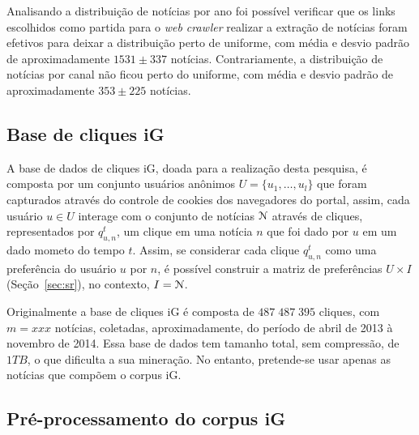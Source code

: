 \documentclass[normaltoc, espacoumemeio, pnumromarab,ruledheader]{abnt}
\begin{document}
Analisando a distribuição de notícias por ano foi possível verificar que os links escolhidos como partida para o \textit{web crawler} realizar a extração de notícias foram efetivos para deixar a distribuição perto de uniforme, com média e desvio padrão de aproximadamente $1531 \pm 337$ notícias.
Contrariamente, a distribuição de notícias por canal não ficou perto do uniforme, com média e desvio padrão de aproximadamente $353 \pm 225$ notícias.

\subsection{Base de cliques iG}
\label{subsec:basecliquesig}

A base de dados de cliques iG, doada para a realização desta pesquisa, é composta por um conjunto usuários anônimos $U = \{ u_1, \dots, u_l \}$ que foram capturados através do controle de cookies dos navegadores do portal, assim, cada usuário $u \in U$ interage com o conjunto de notícias ${\cal N}$ através de cliques, representados por $q_{u,n}^t$, um clique em uma notícia $n$ que foi dado por $u$ em um dado mometo do tempo $t$.
Assim, se considerar cada clique $q_{u,n}^t$ como uma preferência do usuário $u$ por $n$, é possível construir a matriz de preferências $U \times I$ (Seção~\ref{sec:sr}), no contexto, $I = {\cal N}$.

Originalmente a base de cliques iG é composta de $487\;487\;395$ cliques, com $m = xxx$ notícias, coletadas, aproximadamente, do período de abril de 2013 à novembro de 2014. Essa base de dados tem tamanho total, sem compressão, de $1TB$, o que dificulta a sua mineração. No entanto, pretende-se usar apenas as notícias que compõem o corpus iG.

\subsection{Pré-processamento do corpus iG}
\end{document}
